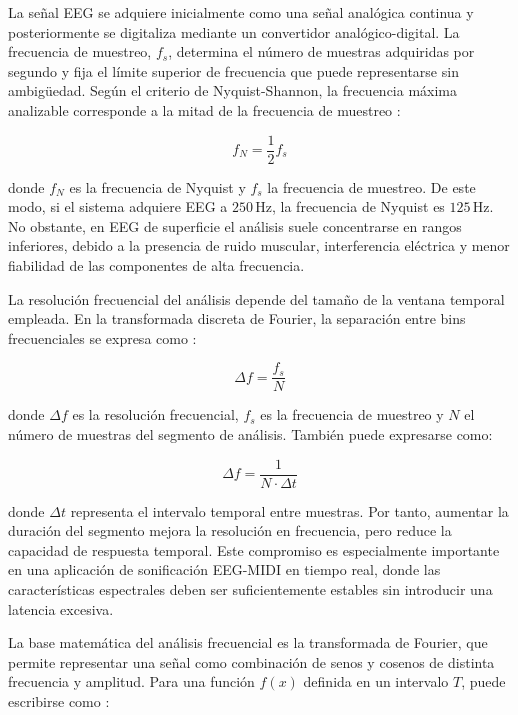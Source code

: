 \documentclass[../main.tex]{subfiles}
\begin{document}
La señal EEG se adquiere inicialmente como una señal analógica continua y posteriormente se digitaliza mediante un convertidor analógico-digital. La frecuencia de muestreo, \(f_s\), determina el número de muestras adquiridas por segundo y fija el límite superior de frecuencia que puede representarse sin ambigüedad. Según el criterio de Nyquist-Shannon, la frecuencia máxima analizable corresponde a la mitad de la frecuencia de muestreo \cite{Sawa2022}:

\begin{equation}
    f_N = \frac{1}{2} f_s
    \label{eq:nyquist}
\end{equation}

donde \(f_N\) es la frecuencia de Nyquist y \(f_s\) la frecuencia de muestreo. De este modo, si el sistema adquiere EEG a \(250\,\text{Hz}\), la frecuencia de Nyquist es \(125\,\text{Hz}\). No obstante, en EEG de superficie el análisis suele concentrarse en rangos inferiores, debido a la presencia de ruido muscular, interferencia eléctrica y menor fiabilidad de las componentes de alta frecuencia.

La resolución frecuencial del análisis depende del tamaño de la ventana temporal empleada. En la transformada discreta de Fourier, la separación entre bins frecuenciales se expresa como \cite{Sawa2022}:

\begin{equation}
    \Delta f = \frac{f_s}{N}
    \label{eq:frequency_bin}
\end{equation}

donde \(\Delta f\) es la resolución frecuencial, \(f_s\) es la frecuencia de muestreo y \(N\) el número de muestras del segmento de análisis. También puede expresarse como:

\begin{equation}
    \Delta f = \frac{1}{N \cdot \Delta t}
    \label{eq:frequency_bin_dt}
\end{equation}

donde \(\Delta t\) representa el intervalo temporal entre muestras. Por tanto, aumentar la duración del segmento mejora la resolución en frecuencia, pero reduce la capacidad de respuesta temporal. Este compromiso es especialmente importante en una aplicación de sonificación EEG-MIDI en tiempo real, donde las características espectrales deben ser suficientemente estables sin introducir una latencia excesiva.

La base matemática del análisis frecuencial es la transformada de Fourier, que permite representar una señal como combinación de senos y cosenos de distinta frecuencia y amplitud. Para una función \(f(x)\) definida en un intervalo \(T\), puede escribirse como \cite{Sawa2022}:
\end{document}
